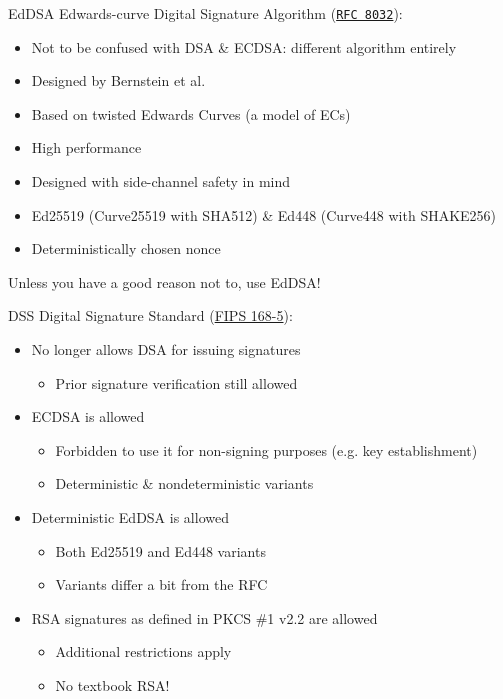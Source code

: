 \begin{frame}{EdDSA}
  Edwards-curve Digital Signature Algorithm (\href{https://datatracker.ietf.org/doc/html/rfc8032}{\texttt{RFC 8032}}):
  \begin{itemize}[<+(1)->]
    \item Not to be confused with DSA \& ECDSA: different algorithm entirely
    \item Designed by \alert{Bernstein} et al.
    \item Based on twisted Edwards Curves (a model of ECs)
    \item High performance
    \item Designed with side-channel safety in mind
    \item Ed25519 (Curve25519 with SHA512) \& Ed448 (Curve448 with SHAKE256)
    \item Deterministically chosen nonce
  \end{itemize}

  \pause
  Unless you have a good reason not to, use EdDSA!
\end{frame}

\begin{frame}{DSS}
  Digital Signature Standard (\href{https://csrc.nist.gov/pubs/fips/186-5/final}{FIPS 168-5}):
  \begin{itemize}[<+(1)->]
    \item No longer allows DSA for issuing signatures
    \begin{itemize}
      \item Prior signature verification still allowed
    \end{itemize}
    \item ECDSA is allowed
    \begin{itemize}
      \item Forbidden to use it for non-signing purposes (e.g. key establishment)
      \item Deterministic \& nondeterministic variants
    \end{itemize}
    \item Deterministic EdDSA is allowed
    \begin{itemize}
      \item Both Ed25519 and Ed448 variants
      \item Variants differ a bit from the RFC
    \end{itemize}
    \item RSA signatures as defined in PKCS \#1 v2.2 are allowed
    \begin{itemize}
      \item Additional restrictions apply
      \item No textbook RSA!
    \end{itemize}
  \end{itemize}
\end{frame}

